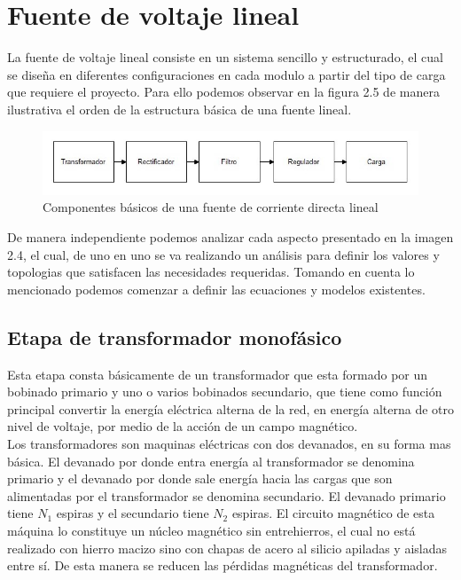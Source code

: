 \newpage
\section{Fuente de voltaje lineal}
La fuente de voltaje lineal consiste en un sistema sencillo y estructurado, el cual se diseña en diferentes configuraciones en cada modulo a partir del tipo de carga que requiere el proyecto. Para ello podemos observar en la figura 2.5 de manera ilustrativa el orden de la estructura básica de una fuente lineal.

\begin{figure}[H]
 \centering
 \includegraphics[width=12cm]{capitulo2/figs/fuentelineal.jpg}
 \caption{Componentes básicos de una fuente de corriente directa lineal}
 \end{figure}
 
 De manera independiente podemos analizar cada aspecto presentado en la imagen 2.4, el cual, de uno en uno se va realizando un análisis para definir los valores y topologias que satisfacen las necesidades requeridas. Tomando en cuenta lo mencionado podemos comenzar a definir las ecuaciones y modelos existentes.


\subsection{Etapa de transformador monofásico}

Esta etapa consta básicamente de un transformador que esta formado por un bobinado primario y uno o varios bobinados secundario, que tiene como función principal
convertir la energía eléctrica alterna de la red, en energía alterna de otro nivel de voltaje, por medio de la acción de un campo magnético.\\

Los transformadores son maquinas eléctricas con dos devanados, en su forma mas básica. El devanado por donde entra energía al transformador se denomina primario y el devanado por donde sale energía hacia las cargas que son alimentadas por el transformador se denomina secundario. El devanado primario tiene $N_{1}$ espiras y el secundario tiene $N_{2}$ espiras. El circuito magnético de esta máquina lo constituye un núcleo magnético sin entrehierros, el cual no está realizado con hierro macizo sino con chapas de acero al silicio apiladas y aisladas entre sí. De esta manera se reducen las pérdidas magnéticas del transformador.\\

